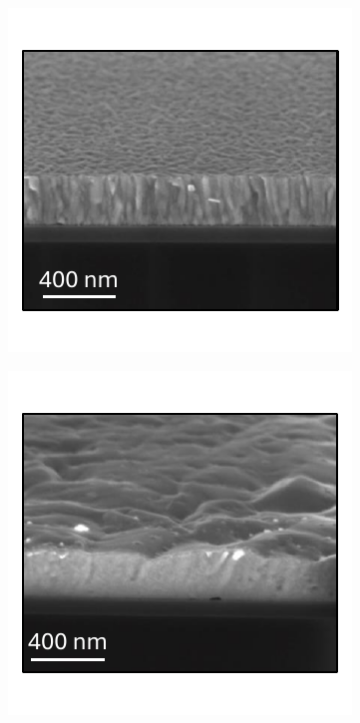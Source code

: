 \begin{figure}[htbp]
    \begin{subfigure}[t]{0.35\textwidth}
        \centering
        \includegraphics[width=\textwidth]{chapters/material_properties/images/SEM_Before.pdf} 
        \caption{}
        \label{fig:ch2:sem_before}
    \end{subfigure}
    \hspace{1.2cm}
    \begin{subfigure}[t]{0.35\textwidth}
        \centering
        \includegraphics[width=\textwidth]{chapters/material_properties/images/SEM_After.pdf} 

\end{subfigure}
\end{figure}
